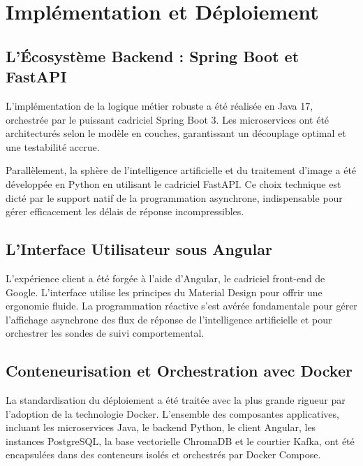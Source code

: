 \chapter{Implémentation et Déploiement}

\section{L'Écosystème Backend : Spring Boot et FastAPI}
L'implémentation de la logique métier robuste a été réalisée en Java 17, orchestrée par le puissant cadriciel Spring Boot 3. Les microservices ont été architecturés selon le modèle en couches, garantissant un découplage optimal et une testabilité accrue.

Parallèlement, la sphère de l'intelligence artificielle et du traitement d'image a été développée en Python en utilisant le cadriciel FastAPI. Ce choix technique est dicté par le support natif de la programmation asynchrone, indispensable pour gérer efficacement les délais de réponse incompressibles.

\section{L'Interface Utilisateur sous Angular}
L'expérience client a été forgée à l'aide d'Angular, le cadriciel front-end de Google. L'interface utilise les principes du Material Design pour offrir une ergonomie fluide. La programmation réactive s'est avérée fondamentale pour gérer l'affichage asynchrone des flux de réponse de l'intelligence artificielle et pour orchestrer les sondes de suivi comportemental.

\section{Conteneurisation et Orchestration avec Docker}
La standardisation du déploiement a été traitée avec la plus grande rigueur par l'adoption de la technologie Docker. L'ensemble des composantes applicatives, incluant les microservices Java, le backend Python, le client Angular, les instances PostgreSQL, la base vectorielle ChromaDB et le courtier Kafka, ont été encapsulées dans des conteneurs isolés et orchestrés par Docker Compose.
